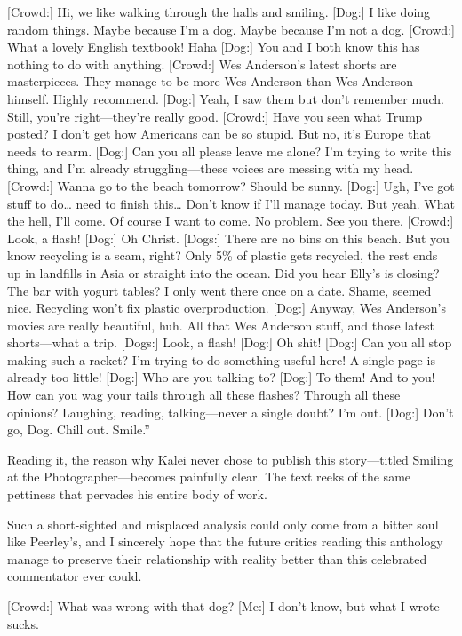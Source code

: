 {[Crowd:] Hi, we like walking through the halls and smiling.
[Dog:] I like doing random things. Maybe because I’m a dog. Maybe because I’m not a dog.
[Crowd:] What a lovely English textbook! Haha
[Dog:] You and I both know this has nothing to do with anything.
[Crowd:] Wes Anderson’s latest shorts are masterpieces. They manage to be more Wes Anderson than Wes Anderson himself. Highly recommend.
[Dog:] Yeah, I saw them but don’t remember much. Still, you’re right—they’re really good.
[Crowd:] Have you seen what Trump posted? I don’t get how Americans can be so stupid. But no, it’s Europe that needs to rearm.
[Dog:] Can you all please leave me alone? I’m trying to write this thing, and I’m already struggling—these voices are messing with my head.
[Crowd:] Wanna go to the beach tomorrow? Should be sunny.
[Dog:] Ugh, I’ve got stuff to do… need to finish this… Don’t know if I’ll manage today. But yeah. What the hell, I’ll come. Of course I want to come. No problem. See you there.
[Crowd:] Look, a flash!
[Dog:] Oh Christ.
[Dogs:] There are no bins on this beach. But you know recycling is a scam, right? Only 5\% of plastic gets recycled, the rest ends up in landfills in Asia or straight into the ocean. Did you hear Elly’s is closing? The bar with yogurt tables? I only went there once on a date. Shame, seemed nice. Recycling won’t fix plastic overproduction.
[Dog:] Anyway, Wes Anderson’s movies are really beautiful, huh. All that Wes Anderson stuff, and those latest shorts—what a trip.
[Dogs:] Look, a flash!
[Dog:] Oh shit!
[Dog:] Can you all stop making such a racket? I’m trying to do something useful here! A single page is already too little!
[Dog:] Who are you talking to?
[Dog:] To them! And to you! How can you wag your tails through all these flashes? Through all these opinions? Laughing, reading, talking—never a single doubt? I’m out.
[Dog:] Don’t go, Dog. Chill out. Smile.”

Reading it, the reason why Kalei never chose to publish this story—titled Smiling at the Photographer—becomes painfully clear. The text reeks of the same pettiness that pervades his entire body of work.

Such a short-sighted and misplaced analysis could only come from a bitter soul like Peerley’s, and I sincerely hope that the future critics reading this anthology manage to preserve their relationship with reality better than this celebrated commentator ever could.

[Crowd:] What was wrong with that dog?
[Me:] I don’t know, but what I wrote sucks.}

